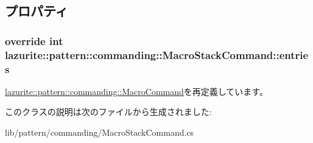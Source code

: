 \subsection{プロパティ}
\hypertarget{classlazurite_1_1pattern_1_1commanding_1_1_macro_stack_command_afdf7dd04a8e9c8ecf69c48af762e23cd}{
\subsubsection[{entries}]{\setlength{\rightskip}{0pt plus 5cm}override int lazurite::pattern::commanding::MacroStackCommand::entries}}
\label{classlazurite_1_1pattern_1_1commanding_1_1_macro_stack_command_afdf7dd04a8e9c8ecf69c48af762e23cd}


\hyperlink{classlazurite_1_1pattern_1_1commanding_1_1_macro_command_ad07b059cd5dce67ac04b21290c29e625}{lazurite::pattern::commanding::MacroCommand}を再定義しています。

このクラスの説明は次のファイルから生成されました:\begin{DoxyCompactItemize}
\item 
lib/pattern/commanding/MacroStackCommand.cs\end{DoxyCompactItemize}
